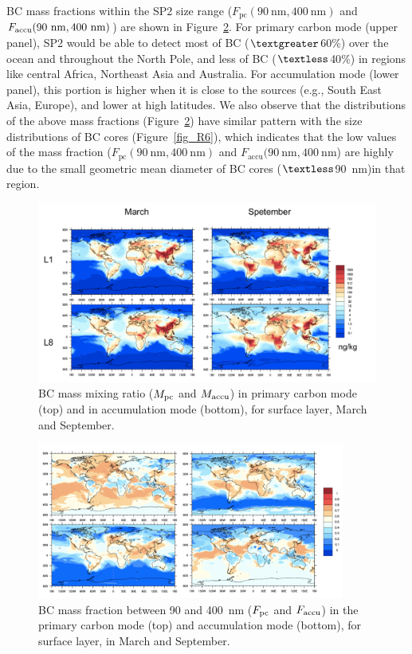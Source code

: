 \documentclass[12pt]{article}
\begin{document}
	BC mass fractions within the SP2 size range ($F_{\text{pc}}(90~\text{nm}, 400~\text{nm})$ and
	$F_{\text{accu}}(90~\rm nm, 400~\rm nm)$) are shown in Figure~\ref{fig_R5}. For primary carbon mode
	(upper panel), SP2 would be able to detect most of BC ($\textgreater$60$\%$) over the ocean and throughout the North Pole, and less of BC ($\textless$40$\%$) in regions like central Africa, Northeast Asia and Australia. For accumulation mode (lower panel), this portion is higher when it is close to the sources (e.g., South East Asia, Europe), and lower at high latitudes. We also observe that the distributions of the above mass fractions (Figure~\ref{fig_R5}) have similar pattern with the size distributions of BC cores (Figure~\ref{fig_R6}), which indicates that the low values of the mass fraction ($F_{\text{pc}}(90~\text{nm}, 400~\text{nm})$ and $F_{\text{accu}}(90~\text{nm}, 400~\text{nm}$) are highly due to the small geometric mean diameter of BC cores ($\textless$90~nm)in that region.
	\begin{figure}[H] 
		\begin{center}
			\includegraphics[width = 1\textwidth]{Rplot01}
			\caption[]{\label{fig_R4}BC mass mixing ratio ($M_{\rm pc}$ and $M_{\rm accu}$) in primary carbon mode (top) and in accumulation mode (bottom), for surface layer, March and September.}
		\end{center}
	\end{figure}
	
	\begin{figure}[H] 
		\begin{center}
			\includegraphics[width = 0.9\textwidth]{Rplot02}
			\caption[]{\label{fig_R5} BC mass fraction between 90 and 400~nm ($F_{\rm pc}$ and $F_{\rm accu}$) in the primary carbon mode (top) and accumulation mode (bottom), for surface layer, in March and September.}
		\end{center}
	\end{figure}
	
\end{document}
